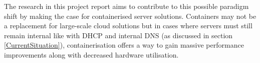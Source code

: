 
The research in this project report aims to contribute to this possible paradigm shift by making the case for containerised server solutions. Containers may not be a replacement for large-scale cloud solutions but in cases where servers must still remain internal like with DHCP and internal DNS (as discussed in section \ref{CurrentSituation}), containerisation offers a way to gain massive performance improvements along with decreased hardware utilisation.

